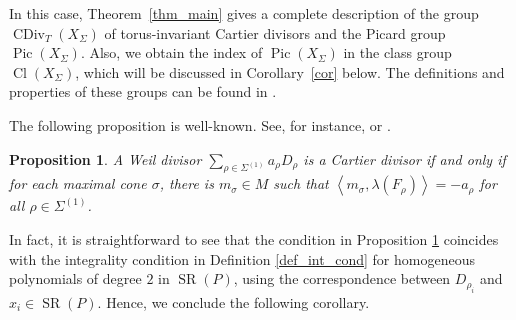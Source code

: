 \documentclass[10pt]{amsart}
\theoremstyle{plain}
\newtheorem{proposition}[theorem]{Proposition}
\theoremstyle{definition}
\numberwithin{equation}{section}
\DeclareMathOperator{\Pic}{Pic}
\DeclareMathOperator{\SR}{SR}
\DeclareMathOperator{\CDiv}{CDiv}
\DeclareMathOperator{\clas}{Cl}
\begin{document}
In this case, Theorem~\ref{thm_main} gives a complete description of the group $\CDiv_T(X_\Sigma)$ of torus-invariant Cartier divisors and the Picard group $\Pic(X_\Sigma)$. Also, we obtain the index of $\Pic(X_\Sigma)$ in the class group $\clas(X_{\Sigma})$, which will be discussed in Corollary~\ref{cor} below.  The definitions and properties of these groups can be found in \cite[Chapter 4]{CLS}.


The following proposition is well-known. See, for instance, \cite[Theorem 4.2.8]{CLS} or \cite[Section 3.3]{Ful}.

\begin{proposition}\label{prop_Cdiv}
A Weil divisor $\sum_{\rho\in \Sigma^{(1)}}a_\rho D_\rho$ is a Cartier divisor if and only if for each maximal cone $\sigma$, there is $m_\sigma\in M$ such that $\left< m_\sigma, \lambda(F_\rho)\right>=-a_\rho$ for all $\rho\in \Sigma^{(1)}$. 
\end{proposition}



In fact, it is straightforward to see that the condition in Proposition \ref{prop_Cdiv} coincides with the integrality condition in Definition \ref{def_int_cond} for homogeneous polynomials of degree $2$ in $\SR(P)$, using the correspondence between $D_{\rho_i}$ and $x_i\in \SR(P)$. Hence, we conclude the following corollary. 
\end{document}
